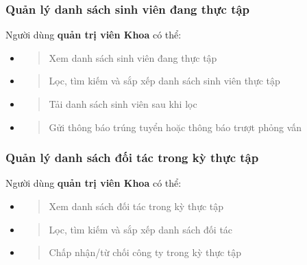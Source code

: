 \documentclass[./../main.tex]{subfiles}
\begin{document}
\hypertarget{quux1ea3n-luxfd-danh-suxe1ch-sinh-viuxean-ux111ang-thux1ef1c-tux1eadp}{%
	\subsubsection{Quản lý danh sách sinh viên đang thực
		tập}\label{quux1ea3n-luxfd-danh-suxe1ch-sinh-viuxean-ux111ang-thux1ef1c-tux1eadp}}
  
Người dùng \textbf{quản trị viên Khoa} có thể:
  
\begin{itemize}
	\item
	      \begin{quote}
	      	Xem danh sách sinh viên đang thực tập
	      \end{quote}
	\item
	      \begin{quote}
	      	Lọc, tìm kiếm và sắp xếp danh sách sinh viên thực tập
	      \end{quote}
	\item
	      \begin{quote}
	      	Tải danh sách sinh viên sau khi lọc
	      \end{quote}
	\item
	      \begin{quote}
	      	Gửi thông báo trúng tuyển hoặc thông báo trượt phỏng vấn
	      \end{quote}
\end{itemize}

\hypertarget{quux1ea3n-luxfd-danh-suxe1ch-ux111ux1ed1i-tuxe1c-trong-kux1ef3-thux1ef1c-tux1eadp}{%
	\subsubsection{Quản lý danh sách đối tác trong kỳ thực
		tập}\label{quux1ea3n-luxfd-danh-suxe1ch-ux111ux1ed1i-tuxe1c-trong-kux1ef3-thux1ef1c-tux1eadp}}
  
Người dùng \textbf{quản trị viên Khoa} có thể:
  
\begin{itemize}
	\item
	      \begin{quote}
	      	Xem danh sách đối tác trong kỳ thực tập
	      \end{quote}
	\item
	      \begin{quote}
	      	Lọc, tìm kiếm và sắp xếp danh sách đối tác
	      \end{quote}
	\item
	      \begin{quote}
	      	Chấp nhận/từ chối công ty trong kỳ thực tập
	      \end{quote}
\end{itemize}
  
\end{document}

